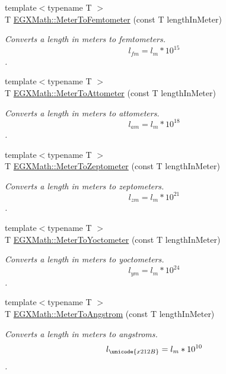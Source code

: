\begin{DoxyCompactItemize}
{\footnotesize template$<$typename T $>$ }\\T \mbox{\hyperlink{group___e_g_x_math-_conversions-_length_conversions-_s_i-_meter-_s_i_ga9fbb9437aa02f79a445e8c6177d0153e}{E\+G\+X\+Math\+::\+Meter\+To\+Femtometer}} (const T length\+In\+Meter)
\begin{DoxyCompactList}\small\item\em Converts a length in meters to femtometers. \[ l_{fm}=l_{m} * 10^{15} \]. \end{DoxyCompactList}\item 
{\footnotesize template$<$typename T $>$ }\\T \mbox{\hyperlink{group___e_g_x_math-_conversions-_length_conversions-_s_i-_meter-_s_i_ga7c27a5231b96b904786f519e8bad257c}{E\+G\+X\+Math\+::\+Meter\+To\+Attometer}} (const T length\+In\+Meter)
\begin{DoxyCompactList}\small\item\em Converts a length in meters to attometers. \[ l_{am}=l_{m} * 10^{18} \]. \end{DoxyCompactList}\item 
{\footnotesize template$<$typename T $>$ }\\T \mbox{\hyperlink{group___e_g_x_math-_conversions-_length_conversions-_s_i-_meter-_s_i_ga865c00bc3abce82de30d18022f460a5c}{E\+G\+X\+Math\+::\+Meter\+To\+Zeptometer}} (const T length\+In\+Meter)
\begin{DoxyCompactList}\small\item\em Converts a length in meters to zeptometers. \[ l_{zm}=l_{m} * 10^{21} \]. \end{DoxyCompactList}\item 
{\footnotesize template$<$typename T $>$ }\\T \mbox{\hyperlink{group___e_g_x_math-_conversions-_length_conversions-_s_i-_meter-_s_i_ga0a9af3add4234d53c0ea30906ead1c3a}{E\+G\+X\+Math\+::\+Meter\+To\+Yoctometer}} (const T length\+In\+Meter)
\begin{DoxyCompactList}\small\item\em Converts a length in meters to yoctometers. \[ l_{ym}=l_{m} * 10^{24} \]. \end{DoxyCompactList}\item 
{\footnotesize template$<$typename T $>$ }\\T \mbox{\hyperlink{group___e_g_x_math-_conversions-_length_conversions-_s_i-_meter-_non-_s_i_ga9e6d5040f58d167bd7a4b6cebb5527ee}{E\+G\+X\+Math\+::\+Meter\+To\+Angstrom}} (const T length\+In\+Meter)
\begin{DoxyCompactList}\small\item\em Converts a length in meters to angstroms. \[ l_{\unicode{x212B}}=l_{m} * 10^{10} \]. \end{DoxyCompactList}\item 

\end{DoxyCompactItemize}
